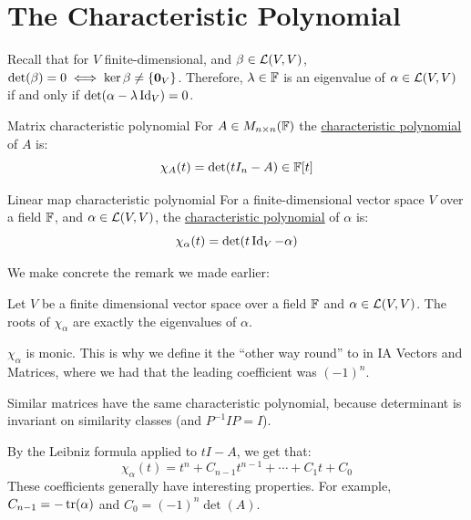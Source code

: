 \documentclass[../Main.tex]{subfiles}
\begin{document}
\section{The Characteristic Polynomial}
Recall that for $V$ finite-dimensional, and $\beta \in \mathcal{L}(V, V)$, $\det(\beta) = 0 \iff \ker{\beta} \neq \{\boldsymbol{0}_V\}$. Therefore, $\lambda \in \mathbb{F}$ is an eigenvalue of $\alpha \in \mathcal{L}(V, V)$ if and only if $\det(\alpha - \lambda \operatorname{Id}_V) = 0$.
\begin{definition}{Matrix characteristic polynomial}
    For $A \in M_{n \times n}(\mathbb{F})$ the \underline{characteristic polynomial} of $A$ is:
    \begin{equation*}
        \chi_A(t) = \det(t I_n - A) \in \mathbb{F}[t]
    \end{equation*}
\end{definition}
\begin{definition}{Linear map characteristic polynomial}
    For a finite-dimensional vector space $V$ over a field $\mathbb{F}$, and $\alpha \in \mathcal{L}(V, V)$, the \underline{characteristic polynomial} of $\alpha$ is:
    \begin{equation*}
        \chi_\alpha(t) = \det(t \operatorname{Id}_V - \alpha)
    \end{equation*}
\end{definition}
We make concrete the remark we made earlier:
\begin{lemma}
    Let $V$ be a finite dimensional vector space over a field $\mathbb{F}$ and $\alpha \in \mathcal{L}(V, V)$.
    The roots of $\chi_\alpha$ are exactly the eigenvalues of $\alpha$.
    \label{lemCharPolyIsEvals}
\end{lemma}
\begin{remarks}
    \item $\chi_\alpha$ is monic. This is why we define it the ``other way round'' to in IA Vectors and Matrices, where we had that the leading coefficient was $(-1)^n$.
    \item Similar matrices have the same characteristic polynomial, because determinant is invariant on similarity classes (and $P^{-1} I P = I$).
    \item By the Leibniz formula applied to $tI - A$, we get that:
        \begin{equation*}
            \chi_\alpha(t) = t^n + C_{n-1} t^{n-1} + \cdots + C_1 t + C_0
        \end{equation*}
        These coefficients generally have interesting properties. For example, $C_{n-1} = -\operatorname{tr}(\alpha)$ and $C_0 = (-1)^n \det(A)$.
\end{remarks}
\end{document}

